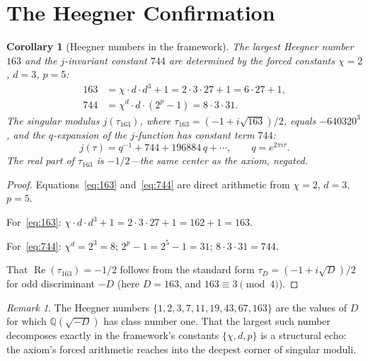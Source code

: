 \documentclass[12pt, a4paper]{article}
\theoremstyle{plain}
\newtheorem{corollary}[theorem]{Corollary}
\theoremstyle{definition}
\theoremstyle{remark}
\newtheorem{remark}[theorem]{Remark}
\newcommand{\Q}{\mathbb{Q}}
\newcommand{\re}{\operatorname{Re}}
\begin{document}
\section{The Heegner Confirmation}\label{sec:heegner}

\begin{corollary}[Heegner numbers in the framework]\label{cor:heegner}
  The largest Heegner number $163$ and the $j$-invariant constant $744$
  are determined by the forced constants $\chi = 2$, $d = 3$, $p = 5$:
  \begin{align}
    163 &= \chi \cdot d \cdot d^3 + 1 = 2 \cdot 3 \cdot 27 + 1
         = 6 \cdot 27 + 1, \label{eq:163} \\
    744 &= \chi^d \cdot d \cdot (2^p - 1)
         = 8 \cdot 3 \cdot 31. \label{eq:744}
  \end{align}
  The singular modulus $j(\tau_{163})$, where
  $\tau_{163} = (-1 + i\sqrt{163})/2$, equals $-640320^3$,
  and the $q$-expansion of the $j$-function has constant term $744$:
  \[
    j(\tau) = q^{-1} + 744 + 196884\,q + \cdots,
    \qquad q = e^{2\pi i \tau}.
  \]
  The real part of $\tau_{163}$ is $-1/2$---the same center as the
  axiom, negated.
\end{corollary}

\begin{proof}
  Equations~\eqref{eq:163} and~\eqref{eq:744} are direct arithmetic
  from $\chi = 2$, $d = 3$, $p = 5$.

  For~\eqref{eq:163}: $\chi \cdot d \cdot d^3 + 1
  = 2 \cdot 3 \cdot 27 + 1 = 162 + 1 = 163$.

  For~\eqref{eq:744}: $\chi^d = 2^3 = 8$;
  $2^p - 1 = 2^5 - 1 = 31$;
  $8 \cdot 3 \cdot 31 = 744$.

  That $\re(\tau_{163}) = -1/2$ follows from the standard form
  $\tau_D = (-1 + i\sqrt{D})/2$ for odd discriminant $-D$
  (here $D = 163$, and $163 \equiv 3 \pmod{4}$).
\end{proof}

\begin{remark}
  The Heegner numbers $\{1, 2, 3, 7, 11, 19, 43, 67, 163\}$ are the
  values of $D$ for which $\Q(\sqrt{-D})$ has class number one.
  That the largest such number decomposes exactly in the framework's
  constants $\{\chi, d, p\}$ is a structural echo: the axiom's
  forced arithmetic reaches into the deepest corner of singular moduli.
\end{remark}
\end{document}
